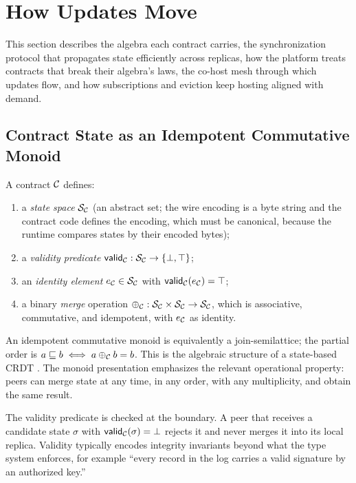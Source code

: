 \section{How Updates Move}
\label{sec:updates}

This section describes the algebra each contract carries, the synchronization protocol that propagates state efficiently across replicas, how the platform treats contracts that break their algebra's laws, the co-host mesh through which updates flow, and how subscriptions and eviction keep hosting aligned with demand.

\subsection{Contract State as an Idempotent Commutative Monoid}

\begin{definition}
\label{def:algebra}
A contract $\mathcal{C}$ defines:
\begin{enumerate}[leftmargin=1.4em, itemsep=2pt, topsep=2pt]
  \item a \emph{state space} $\mathcal{S}_{\mathcal{C}}$ (an abstract set; the wire encoding is a byte string and the contract code defines the encoding, which must be canonical, because the runtime compares states by their encoded bytes);
  \item a \emph{validity predicate} $\mathsf{valid}_{\mathcal{C}} : \mathcal{S}_{\mathcal{C}} \to \{\bot, \top\}$;
  \item an \emph{identity element} $e_{\mathcal{C}} \in \mathcal{S}_{\mathcal{C}}$ with $\mathsf{valid}_{\mathcal{C}}(e_{\mathcal{C}}) = \top$;
  \item a binary \emph{merge} operation $\oplus_{\mathcal{C}} : \mathcal{S}_{\mathcal{C}} \times \mathcal{S}_{\mathcal{C}} \to \mathcal{S}_{\mathcal{C}}$, which is associative, commutative, and idempotent, with $e_{\mathcal{C}}$ as identity.
\end{enumerate}
\end{definition}

An idempotent commutative monoid is equivalently a join-semilattice; the partial order is $a \sqsubseteq b \iff a \oplus_{\mathcal{C}} b = b$. This is the algebraic structure of a state-based CRDT \citep{shapiro2011crdt}. The monoid presentation emphasizes the relevant operational property: peers can merge state at any time, in any order, with any multiplicity, and obtain the same result.

The validity predicate is checked at the boundary. A peer that receives a candidate state $\sigma$ with $\mathsf{valid}_{\mathcal{C}}(\sigma) = \bot$ rejects it and never merges it into its local replica. Validity typically encodes integrity invariants beyond what the type system enforces, for example ``every record in the log carries a valid signature by an authorized key.''

